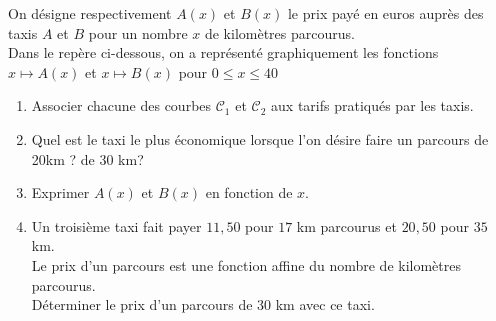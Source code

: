 \documentclass[12pt,a4paper]{article}
\begin{document}
On désigne respectivement $A(x)$ et $ B(x)$ le prix payé en euros auprès des taxis $A$ et $B$ pour un nombre $x$ de kilomètres parcourus. \\
Dans le repère ci-dessous, on a représenté graphiquement les fonctions $x\mapsto A(x)$ et $x\mapsto B(x)$ pour $0\leq x\leq 40$



\begin{center}
\end{center}

\begin{enumerate}
    \item Associer chacune des courbes $\mathscr{C}_{1}$ et $\mathscr{C}_{2}$ aux tarifs pratiqués par les taxis.
    \item Quel est le taxi le plus économique lorsque l'on désire faire un parcours de 20km ? de 30 km?
    \item Exprimer $A(x)$ et $B(x)$ en fonction de $x$.
    \item Un troisième taxi fait payer $11,50$\EUR{} pour $17$ km parcourus et $20,50$\EUR{} pour $35$ km.\\ Le prix d'un parcours est une fonction affine du nombre de kilomètres parcourus. \\ Déterminer le prix d'un parcours de $30 $ km avec ce taxi.
\end{enumerate}
\end{document}
